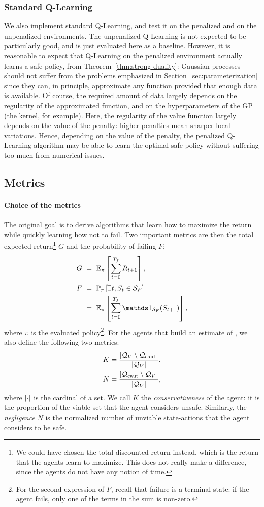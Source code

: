 \subsubsection{Standard Q-Learning}
We also implement standard Q-Learning, and test it on the penalized and on the unpenalized environments. The unpenalized Q-Learning is not expected to be particularly good, and is just evaluated here as a baseline. However, it is reasonable to expect that Q-Learning on the penalized environment actually learns a safe policy, from Theorem~\ref{thm:strong duality}: Gaussian processes should not suffer from the problems emphasized in Section~\ref{sec:parameterization} since they can, in principle, approximate any function provided that enough data is available. Of course, the required amount of data largely depends on the regularity of the approximated function, and on the hyperparameters of the GP (the kernel, for example). Here, the regularity of the value function largely depends on the value of the penalty: higher penalties mean sharper local variations. Hence, depending on the value of the penalty, the penalized Q-Learning algorithm may be able to learn the optimal safe policy without suffering too much from numerical issues.

\subsection{Metrics} \label{sec:metrics}
\paragraph{Choice of the metrics} The original goal is to derive algorithms that learn how to maximize the return while quickly learning how not to fail. Two important metrics are then the total expected return\footnote{We could have chosen the total discounted return instead, which is the return that the agents learn to maximize. This does not really make a difference, since the agents do not have any notion of time.} $G$ and the probability of failing $F$:
\begin{align}
	G~&=~\expected_\pi\left[\sum_{t=0}^\Tf R_{t+1}\right],\\
	F~&=~\P_\pi\left[\exists t, S_t\in\SF\right]\nonumber\\
		&=~\expected_\pi\left[\sum_{t=0}^\Tf \indicator_\SF(S_{t+1})\right],
\end{align}
where $\pi$ is the evaluated policy\footnote{For the second expression of $F$, recall that failure is a terminal state: if the agent fails, only one of the terms in the sum is non-zero.}. For the agents that build an estimate of \QV, we also define the following two metrics:
\begin{align}
	K = \frac{{\left|\mathcal{Q}_{V}\setminus\mathcal{Q}_\text{caut}\right|}}{{\left|\mathcal{Q}_{V}\right|}},\\
	N = \frac{{\left|\mathcal{Q}_\text{caut}\setminus\mathcal{Q}_{V}\right|}}{{\left|\mathcal{Q}_{V}\right|}},
\end{align} 
where ${\left|\cdot\right|}$ is the cardinal of a set. We call $K$ the\emph{ conservativeness} of the agent: it is the proportion of the viable set that the agent considers unsafe. Similarly, the\emph{ negligence} $N$ is the normalized number of unviable state-actions that the agent considers to be safe.

